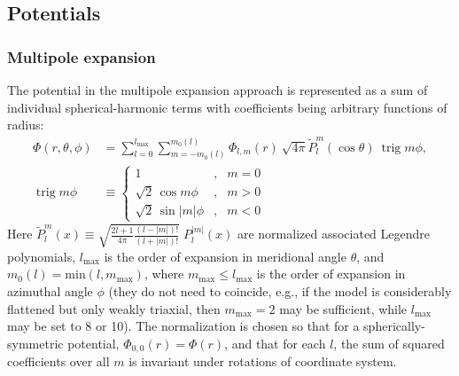 \documentclass[12pt]{article}
\DeclareMathOperator{\trig}{trig}
\begin{document}
\subsection{Potentials}  \label{sec:PotentialDetails}


\subsubsection{Multipole expansion}  \label{sec:PotentialMultipoleDetails}

The potential in the multipole expansion approach is represented as a sum of individual spherical-harmonic terms with coefficients being arbitrary functions of radius:
\begin{align}
\Phi(r,\theta,\phi) &= \sum_{l=0}^{l_\mathrm{max}}\sum_{m=-m_0(l)}^{m_0(l)}
\Phi_{l,m}(r)\: \sqrt{4\pi} \tilde P_l^m(\cos\theta)\:\trig m\phi, \\
\trig m\phi &\equiv \left\{\begin{array}{rcl} 
  1 &,& m=0 \\
  \sqrt{2}\,\cos  m \phi &,& m > 0 \\
  \sqrt{2}\,\sin |m|\phi &,& m < 0 
\end{array}\right.   \nonumber
\end{align}
Here $\tilde P_l^m(x) \equiv \sqrt{\frac{2l+1}{4\pi}\frac{(l-|m|)!}{(l+|m|)!}} \;P_l^{|m|}(x)$ 
are normalized associated Legendre polynomials, $l_\mathrm{max}$ is the order of expansion in meridional angle $\theta$, and $m_0(l) = \mathrm{min}(l, m_\mathrm{max})$, where $m_\mathrm{max} \le l_\mathrm{max}$ is the order of expansion in azimuthal angle $\phi$ (they do not need to coincide, e.g., if the model is considerably flattened but only weakly triaxial, then $m_\mathrm{max}=2$ may be sufficient, while $l_\mathrm{max}$ may be set to 8 or 10). The normalization is chosen so that for a spherically-symmetric potential, $\Phi_{0,0}(r)=\Phi(r)$, and that for each $l$, the sum of squared coefficients over all $m$ is invariant under rotations of coordinate system.
\end{document}
